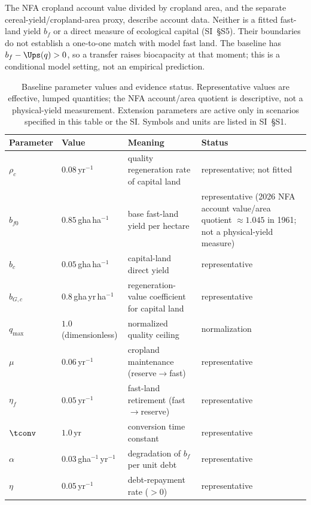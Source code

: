 The NFA cropland account value divided by cropland area, and the separate cereal-yield/cropland-area proxy, describe account data. Neither is a fitted fast-land yield $b_f$ or a direct measure of ecological capital (SI~\S S5). Their boundaries do not establish a one-to-one match with model fast land. The baseline has $b_f-\Ups(q)>0$, so a transfer raises biocapacity at that moment; this is a conditional model setting, not an empirical prediction.

\begin{table}[!htbp]
\centering\footnotesize
\renewcommand{\arraystretch}{0.95}
\caption{Baseline parameter values and evidence status. Representative values are effective, lumped quantities; the NFA account/area quotient is descriptive, not a physical-yield measurement. Extension parameters are active only in scenarios specified in this table or the SI. Symbols and units are listed in SI~\S S1.}
\label{tab:params}
\setlength{\tabcolsep}{4pt}
\begin{tabularx}{\textwidth}{@{}>{\raggedright\arraybackslash}p{} >{\raggedright\arraybackslash}p{} >{\raggedright\arraybackslash}X >{\raggedright\arraybackslash}p{}@{}}
\toprule
Parameter & Value & Meaning & Status \\
\midrule
$\rho_c$ & $0.08$\,yr$^{-1}$ & quality regeneration rate of capital land & representative; not fitted \\
$b_{f0}$ & $0.85$\,gha\,ha$^{-1}$ & base fast-land yield per hectare & representative (2026 NFA account value/area quotient $\approx1.045$ in 1961; not a physical-yield measure) \\
$b_c$ & $0.05$\,gha\,ha$^{-1}$ & capital-land direct yield & representative \\
$b_{G,c}$ & $0.8$\,gha\,yr\,ha$^{-1}$ & regeneration-value coefficient for capital land & representative \\
$q_{\max}$ & $1.0$ (dimensionless) & normalized quality ceiling & normalization \\
$\mu$ & $0.06$\,yr$^{-1}$ & cropland maintenance (reserve$\to$fast) & representative \\
$\eta_f$ & $0.05$\,yr$^{-1}$ & fast-land retirement (fast$\to$reserve) & representative \\
$\tconv$ & $1.0$\,yr & conversion time constant & representative \\
$\alpha$ & $0.03$\,gha$^{-1}$\,yr$^{-1}$ & degradation of $b_f$ per unit debt & representative \\
$\eta$ & $0.05$\,yr$^{-1}$ & debt-repayment rate ($>0$) & representative \\

\end{tabularx}
\end{table}

